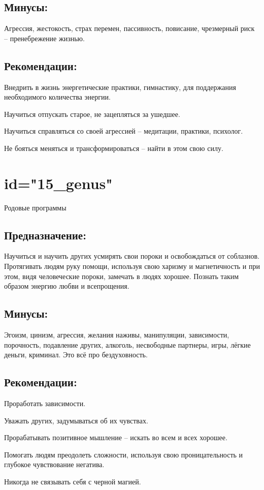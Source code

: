 \subsection{Минусы:}
Агрессия, жестокость, страх перемен, пассивность, повисание, 
чрезмерный риск – пренебрежение жизнью.
\endsubsection

\subsection{Рекомендации:}
\item Внедрить в жизнь энергетические практики, гимнастику, для 
поддержания необходимого количества энергии.
\item Научиться отпускать старое, не зацепляться за ушедшее.
\item Научиться справляться со своей агрессией – медитации, практики, 
психолог.
\item Не бояться меняться и трансформироваться – найти в этом свою 
силу.
\endsubsection

\endsection

\section{id="15_genus"}{Родовые программы}

\subsection{Предназначение:}
Научиться и научить других усмирять свои пороки и освобождаться 
от соблазнов. Протягивать людям руку помощи, используя свою 
харизму и магнетичность и при этом, видя человеческие пороки, 
замечать в людях хорошее. Познать таким образом энергию любви и 
всепрощения.
\endsubsection

\subsection{Минусы:}
Эгоизм, цинизм, агрессия, желания наживы, манипуляции, зависимости, 
порочность, подавление других, алкоголь, несвободные партнеры, 
игры, лёгкие деньги, криминал. Это всё про бездуховность.
\endsubsection

\subsection{Рекомендации:}
\item Проработать зависимости.
\item Уважать других, задумываться об их чувствах.
\item Прорабатывать позитивное мышление – искать во всем и всех 
хорошее.
\item Помогать людям преодолеть сложности, используя свою 
проницательность и глубокое чувствование негатива.
\item Никогда не связывать себя с черной магией.
\endsubsection

